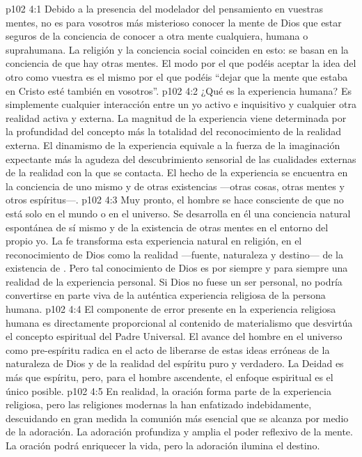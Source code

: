 \vs p102 4:1 Debido a la presencia del modelador del pensamiento en vuestras mentes, no es para vosotros más misterioso conocer la mente de Dios que estar seguros de la conciencia de conocer a otra mente cualquiera, humana o suprahumana. La religión y la conciencia social coinciden en esto: se basan en la conciencia de que hay otras mentes. El modo por el que podéis aceptar la idea del otro como vuestra es el mismo por el que podéis “dejar que la mente que estaba en Cristo esté también en vosotros”.
\vs p102 4:2 ¿Qué es la experiencia humana? Es simplemente cualquier interacción entre un yo activo e inquisitivo y cualquier otra realidad activa y externa. La magnitud de la experiencia viene determinada por la profundidad del concepto más la totalidad del reconocimiento de la realidad externa. El dinamismo de la experiencia equivale a la fuerza de la imaginación expectante más la agudeza del descubrimiento sensorial de las cualidades externas de la realidad con la que se contacta. El hecho de la experiencia se encuentra en la conciencia de uno mismo y de otras existencias ---otras cosas, otras mentes y otros espíritus---.
\vs p102 4:3 Muy pronto, el hombre se hace consciente de que no está solo en el mundo o en el universo. Se desarrolla en él una conciencia natural espontánea de sí mismo y de la existencia de otras mentes en el entorno del propio yo. La fe transforma esta experiencia natural en religión, en el reconocimiento de Dios como la realidad ---fuente, naturaleza y destino--- de la existencia de . Pero tal conocimiento de Dios es por siempre y para siempre una realidad de la experiencia personal. Si Dios no fuese un ser personal, no podría convertirse en parte viva de la auténtica experiencia religiosa de la persona humana.
\vs p102 4:4 El componente de error presente en la experiencia religiosa humana es directamente proporcional al contenido de materialismo que desvirtúa el concepto espiritual del Padre Universal. El avance del hombre en el universo como pre\hyp{}espíritu radica en el acto de liberarse de estas ideas erróneas de la naturaleza de Dios y de la realidad del espíritu puro y verdadero. La Deidad es más que espíritu, pero, para el hombre ascendente, el enfoque espiritual es el único posible.
\vs p102 4:5 \pc En realidad, la oración forma parte de la experiencia religiosa, pero las religiones modernas la han enfatizado indebidamente, descuidando en gran medida la comunión más esencial que se alcanza por medio de la adoración. La adoración profundiza y amplia el poder reflexivo de la mente. La oración podrá enriquecer la vida, pero la adoración ilumina el destino.
